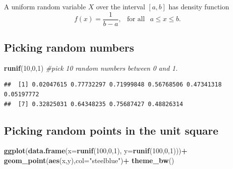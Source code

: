 \documentclass[
]{book}
\newenvironment{Shaded}{\begin{snugshade}}{\end{snugshade}}
\newcommand{\AttributeTok}[1]{\textcolor[rgb]{0.13,0.29,0.53}{#1}}
\newcommand{\CommentTok}[1]{\textcolor[rgb]{0.56,0.35,0.01}{\textit{#1}}}
\newcommand{\DecValTok}[1]{\textcolor[rgb]{0.00,0.00,0.81}{#1}}
\newcommand{\FunctionTok}[1]{\textcolor[rgb]{0.13,0.29,0.53}{\textbf{#1}}}
\newcommand{\NormalTok}[1]{#1}
\newcommand{\SpecialCharTok}[1]{\textcolor[rgb]{0.81,0.36,0.00}{\textbf{#1}}}
\newcommand{\StringTok}[1]{\textcolor[rgb]{0.31,0.60,0.02}{#1}}
\theoremstyle{definition}
\theoremstyle{definition}
\theoremstyle{definition}
\theoremstyle{definition}
\theoremstyle{remark}
\begin{document}
A uniform random variable \(X\) over the interval \([a,b]\) has density function \[f(x) = \frac{1}{b-a}, ~~\text{ for all }~~ a \leq x \leq b.\]

\subsection*{Picking random numbers}\label{picking-random-numbers}

\begin{Shaded}
\begin{Highlighting}[]
\FunctionTok{runif}\NormalTok{(}\DecValTok{10}\NormalTok{,}\DecValTok{0}\NormalTok{,}\DecValTok{1}\NormalTok{) }\CommentTok{\#pick 10 random numbers between 0 and 1.}
\end{Highlighting}
\end{Shaded}

\begin{verbatim}
##  [1] 0.02047615 0.77732297 0.71999848 0.56768506 0.47341318 0.05197772
##  [7] 0.32825031 0.64348235 0.75687427 0.48826314
\end{verbatim}

\subsection*{Picking random points in the unit square}\label{picking-random-points-in-the-unit-square}

\begin{Shaded}
\begin{Highlighting}[]
\FunctionTok{ggplot}\NormalTok{(}\FunctionTok{data.frame}\NormalTok{(}\AttributeTok{x=}\FunctionTok{runif}\NormalTok{(}\DecValTok{100}\NormalTok{,}\DecValTok{0}\NormalTok{,}\DecValTok{1}\NormalTok{),}
                 \AttributeTok{y=}\FunctionTok{runif}\NormalTok{(}\DecValTok{100}\NormalTok{,}\DecValTok{0}\NormalTok{,}\DecValTok{1}\NormalTok{)))}\SpecialCharTok{+}
  \FunctionTok{geom\_point}\NormalTok{(}\FunctionTok{aes}\NormalTok{(x,y),}\AttributeTok{col=}\StringTok{"steelblue"}\NormalTok{)}\SpecialCharTok{+}
  \FunctionTok{theme\_bw}\NormalTok{()}
\end{Highlighting}
\end{Shaded}
\end{document}
